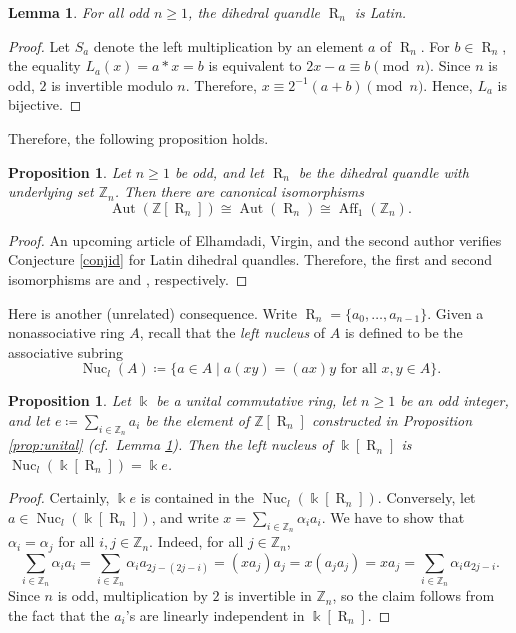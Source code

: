 \documentclass[12 pt]{amsart}
\newtheorem{lemma}[theorem]{Lemma}
\newtheorem{proposition}[theorem]{Proposition}
\theoremstyle{definition}
\theoremstyle{remark}
\numberwithin{equation}{section}
\newcommand{\Aut}{\operatorname{Aut}}
\newcommand{\R}{\operatorname{R}}
\newcommand{\Aff}{\operatorname{Aff}}
\newcommand{\Nuc}{\operatorname{Nuc}}
\newcommand{\Z}{\mathbb{Z}}
\renewcommand{\k}{\Bbbk}
\begin{document}
\begin{lemma}\label{lem:odd}
  For all odd $n\geq 1$, the dihedral quandle $\R_n$ is Latin.  
\end{lemma}
\begin{proof}
    Let $S_a$ denote the left multiplication by an element $a$ of $\R_n$. For $b \in \R_n$, the equality $L_a(x)=a*x = b$ is equivalent to $2x - a \equiv b \pmod{n}$. Since $n$ is odd, $2$ is invertible modulo $n$. Therefore, $x \equiv 2^{-1}(a + b) \pmod{n}$. Hence, $L_a$ is bijective.
\end{proof}
  Therefore, the following proposition holds.
 \begin{proposition}\label{prop:odd-dihedral}
     Let $n\geq 1$ be odd, and let $\R_n$ be the dihedral quandle with underlying set $\Z_n$. Then there are canonical isomorphisms
     \[\Aut (\mathbb{Z}[\R_n])\cong \mathrm{\Aut }(\R_n)\cong\Aff_1(\Z_n).\]
 \end{proposition}
 \begin{proof}
     An upcoming article of Elhamdadi, Virgin, and the second author \cite{ETV} verifies Conjecture \ref{conjid} for Latin dihedral quandles. Therefore, the first and second isomorphisms are \cite[Prop.\ 2.4]{BE} and \cite[Thm.\ 2.1]{Elhamdadi2012}, respectively.
 \end{proof}

 Here is another (unrelated) consequence. Write $\R_n=\{a_0,\dots,a_{n-1}\}$. 
Given a nonassociative ring $A$, recall that the \emph{left nucleus} of $A$ is defined to be the associative subring
\[
\Nuc_l(A)\coloneq\{a\in A\mid a(xy)=(ax)y\text{ for all }x,y\in A\}.
\]

\begin{proposition}
    Let $\k$ be a unital commutative ring, let $n\geq 1$ be an odd integer, and let $e\coloneq\sum_{i\in\Z_n}a_i$ be the element of $\Z[\R_n]$ constructed in Proposition \ref{prop:unital} (cf.\ Lemma \ref{lem:odd}). Then the left nucleus of $\k[\R_n]$ is $\Nuc_l(\k[\R_n])=\k e$.
\end{proposition}

\begin{proof}
    Certainly, $\k e$ is contained in the $\Nuc_l(\k[\R_n])$. Conversely, let $a\in\Nuc_l(\k[\R_n])$, and write $x=\sum_{i\in \Z_n}\alpha_ia_i$. We have to show that $\alpha_i=\alpha_j$ for all $i,j\in\Z_n$. Indeed, for all $j\in\Z_n$, 
    \[
    \sum_{i\in \Z_n}\alpha_ia_i=\sum_{i\in \Z_n}\alpha_ia_{2j-(2j-i)}=(xa_j)a_j=x(a_ja_j)=xa_j=\sum_{i\in \Z_n}\alpha_ia_{2j-i}.
    \]
    Since $n$ is odd, multiplication by $2$ is invertible in $\Z_n$, so the claim follows from the fact that the $a_i$'s are linearly independent in $\k[\R_n]$.
\end{proof}
\end{document}
